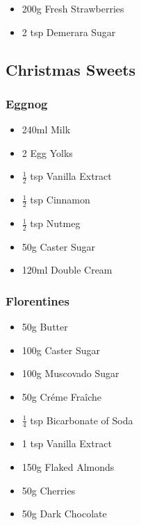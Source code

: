 \documentclass[11pt, english]{article}
\begin{document}
	\begin{itemize}
        \setlength\itemsep{0cm}
                \item 200g Fresh Strawberries
		\item 2 tsp Demerara Sugar
        \end{itemize}

\newpage

	\subsection{Christmas Sweets}

		\subsubsection*{Eggnog}

	\begin{itemize}
        \setlength\itemsep{0cm}
                \item 240ml Milk
		\item 2 Egg Yolks
		\item $\frac{1}{2}$ tsp Vanilla Extract
		\item $\frac{1}{2}$ tsp Cinnamon
		\item $\frac{1}{2}$ tsp Nutmeg
		\item 50g Caster Sugar
		\item 120ml Double Cream
        \end{itemize}

		\subsubsection*{Florentines}

	\begin{itemize}
        \setlength\itemsep{0cm}
                \item 50g Butter
		\item 100g Caster Sugar
		\item 100g Muscovado Sugar
		\item 50g Cr\'{e}me Fra\^{i}che
		\item $\frac{1}{4}$ tsp Bicarbonate of Soda
		\item 1 tsp Vanilla Extract
		\item 150g Flaked Almonds
		\item 50g Cherries
		\item 50g Dark Chocolate
        \end{itemize}
\end{document}
